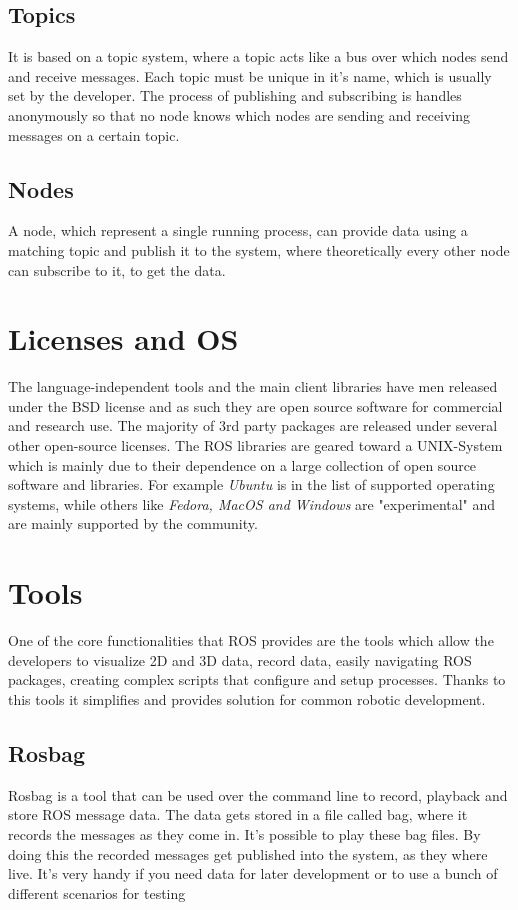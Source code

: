 \subsection{Topics}
It is based on a topic system, where a topic acts like a bus over which nodes send and receive messages. Each topic must be unique in it's name, which is usually set by the developer. The process of publishing and subscribing is handles anonymously so that no node knows which nodes are sending and receiving messages on a certain topic.

\subsection{Nodes}
A node, which represent a single running process, can provide data using a matching topic and publish it to the system, where theoretically every other node can subscribe to it, to get the data. 

\section{Licenses and OS}
The language-independent tools and the main client libraries have men released under the BSD license and as such they are open source software for commercial and research use. The majority of 3rd party packages are released under several other open-source licenses.\newline
The ROS libraries are geared toward a UNIX-System which is mainly due to their dependence on a large collection of open source software and libraries.
For example \textit{Ubuntu} is in the list of supported operating systems, while others like \textit{Fedora, MacOS and Windows} are "experimental" and are mainly supported by the community.

\section{Tools}
One of the core functionalities that ROS provides are the tools which allow the developers to visualize 2D and 3D data, record data, easily navigating ROS packages, creating complex scripts that configure and setup processes. Thanks to this tools it simplifies and provides solution for common robotic development.

\subsection{Rosbag}
Rosbag is a tool that can be used over the command line to record, playback and store ROS message data. The data gets stored in a file called bag, where it records the messages as they come in. It's possible to play these bag files. By doing this the recorded messages get published into the system, as they where live. It's very handy if you need data for later development or to use a bunch of different scenarios for testing

